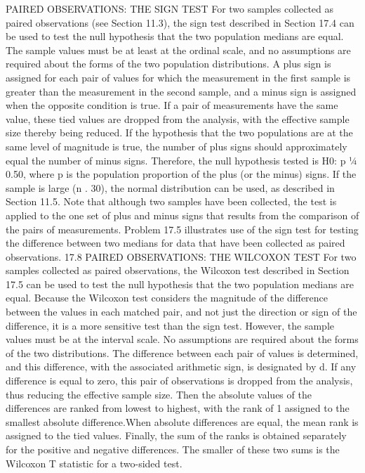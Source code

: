 PAIRED OBSERVATIONS: THE SIGN TEST
For two samples collected as paired observations (see Section 11.3), the sign test described in Section 17.4
can be used to test the null hypothesis that the two population medians are equal. The sample values must be at
least at the ordinal scale, and no assumptions are required about the forms of the two population distributions.
A plus sign is assigned for each pair of values for which the measurement in the first sample is greater than
the measurement in the second sample, and a minus sign is assigned when the opposite condition is true. If a
pair of measurements have the same value, these tied values are dropped from the analysis, with the effective
sample size thereby being reduced. If the hypothesis that the two populations are at the same level of magnitude
is true, the number of plus signs should approximately equal the number of minus signs. Therefore, the null
hypothesis tested is H0: p ¼ 0.50, where p is the population proportion of the plus (or the minus) signs. If the
sample is large (n . 30), the normal distribution can be used, as described in Section 11.5. Note that although
two samples have been collected, the test is applied to the one set of plus and minus signs that results from the
comparison of the pairs of measurements.
Problem 17.5 illustrates use of the sign test for testing the difference between two medians for data that
have been collected as paired observations.
17.8 PAIRED OBSERVATIONS: THE WILCOXON TEST
For two samples collected as paired observations, the Wilcoxon test described in Section 17.5 can be used
to test the null hypothesis that the two population medians are equal. Because the Wilcoxon test considers the
magnitude of the difference between the values in each matched pair, and not just the direction or sign of the
difference, it is a more sensitive test than the sign test. However, the sample values must be at the interval scale.
No assumptions are required about the forms of the two distributions.
The difference between each pair of values is determined, and this difference, with the associated
arithmetic sign, is designated by d. If any difference is equal to zero, this pair of observations is dropped from
the analysis, thus reducing the effective sample size. Then the absolute values of the differences are ranked from
lowest to highest, with the rank of 1 assigned to the smallest absolute difference.When absolute differences are
equal, the mean rank is assigned to the tied values. Finally, the sum of the ranks is obtained separately for the
positive and negative differences. The smaller of these two sums is the Wilcoxon T statistic for a two-sided test.
